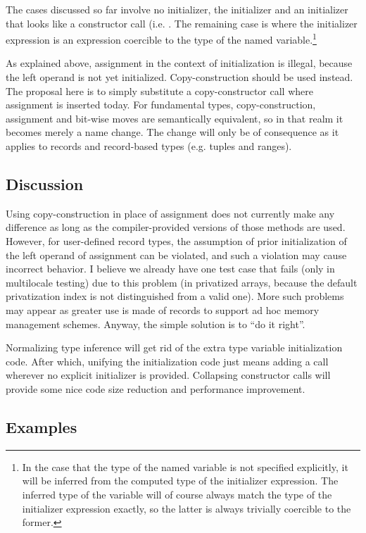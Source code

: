 The cases discussed so far involve no initializer, the  initializer and an
initializer that looks like a constructor call (i.e. .  The remaining
case is where the initializer expression is an expression coercible to the type of the
named variable.\footnote{In the case that the type of the named variable is not specified
  explicitly, it will be inferred from the computed type of the initializer expression.
  The inferred type of the variable will of course always match the type of the
  initializer expression exactly, so the latter is always trivially coercible to the
  former.}

As explained above, assignment in the context of initialization is illegal, because the
left operand is not yet initialized.  Copy-construction should be used instead.  The
proposal here is to simply substitute a copy-constructor call where assignment is inserted
today.  For fundamental types, copy-construction, assignment and bit-wise moves are
semantically equivalent, so in that realm it becomes merely a name change.  The change
will only be of consequence as it applies to records and record-based types (e.g. tuples
and ranges).

\subsection{Discussion}

Using copy-construction in place of assignment does not currently make any difference as
long as the compiler-provided versions of those methods are used.  However, for
user-defined record types, the assumption of prior initialization of the left operand of
assignment can be violated, and such a violation may cause incorrect behavior.  I believe
we already have one test case that fails (only in multilocale testing) due to this
problem (in privatized arrays, because the default privatization index is not distinguished
from a valid one).  More such problems may appear as greater use is made of records to
support ad hoc memory management schemes.  Anyway, the simple solution is to ``do it
right''.

Normalizing type inference will get rid of the extra type variable initialization code.
After which, unifying the initialization code just means adding a  call
wherever no explicit initializer is provided.  Collapsing constructor calls will provide
some nice code size reduction and performance improvement.

\subsection{Examples}

